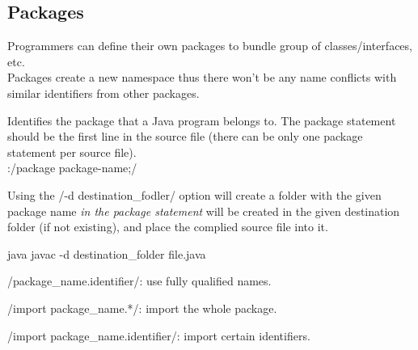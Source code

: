 \subsection{Packages}
\begin{sectionbox}\nospacing
  Programmers can define their own packages to bundle group of
  classes/interfaces, etc.\\
  Packages create a new namespace thus there won't be any name conflicts with
  similar identifiers from other packages.
\end{sectionbox}
\begin{defnbox}\nospacing
  \begin{defn}
    Identifies the package that a Java program belongs to.
    The package statement should be the first line in the source file
    (there can be only one package statement per source file).\\
    :\hfil \javainline/package package-name;/
  \end{defn}
\end{defnbox}
\begin{sectionbox}\nospacing
  Using the \javainline/-d destination_fodler/ option will create a folder with
  the given package name \textit{in the package statement} will be created in
  the given destination folder (if not existing), and place the complied source file
  into it.
  \begin{mintlinebox}{java}
		javac -d destination_folder file.java
  \end{mintlinebox}
\end{sectionbox}
\begin{sectionbox}\nospacing
  \begin{itemizenosep}
      \item \javainline/package_name.identifier/: use fully qualified names.
    	\item \javainline/import package_name.*/: import the whole package.
    	\item \javainline/import package_name.identifier/: import certain identifiers.
  \end{itemizenosep}
\end{sectionbox}
